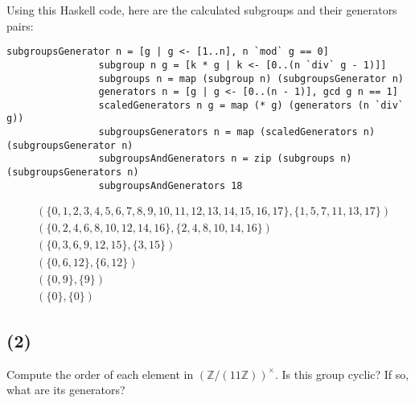 \documentclass[fleqn]{article}
\begin{document}
            Using this Haskell code, here are the calculated subgroups and their generators pairs:
            \begin{Verbatim}[xleftmargin=-2cm]
                subgroupsGenerator n = [g | g <- [1..n], n `mod` g == 0]
                subgroup n g = [k * g | k <- [0..(n `div` g - 1)]]
                subgroups n = map (subgroup n) (subgroupsGenerator n)
                generators n = [g | g <- [0..(n - 1)], gcd g n == 1]
                scaledGenerators n g = map (* g) (generators (n `div` g))
                subgroupsGenerators n = map (scaledGenerators n) (subgroupsGenerator n)
                subgroupsAndGenerators n = zip (subgroups n) (subgroupsGenerators n) 
                subgroupsAndGenerators 18
            \end{Verbatim}
            \begin{align}
                & (\{0, 1, 2, 3, 4, 5, 6, 7, 8, 9, 10, 11, 12, 13, 14, 15, 16, 17\}, \{1, 5, 7, 11, 13, 17\}) \\
                & (\{0, 2, 4, 6, 8, 10, 12, 14, 16\}, \{2, 4, 8, 10, 14, 16\}) \\
                & (\{0, 3, 6, 9, 12, 15\}, \{3, 15\}) \\
                & (\{0, 6, 12\}, \{6, 12\}) \\
                & (\{0, 9\}, \{9\}) \\
                & (\{0\}, \{0\})
            \end{align}
            
        \subsection{(2)}
        Compute the order of each element in $(\mathbb{Z}/(11 \mathbb{Z}))^{\times}$.  Is this group cyclic?  If so, what are its generators?
            
\end{document}

